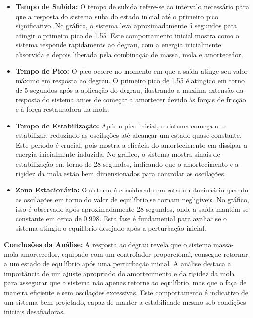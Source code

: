 \begin{itemize}
    \item \textbf{Tempo de Subida:} O tempo de subida refere-se ao intervalo necessário para que a resposta do sistema suba do estado inicial até o primeiro pico significativo. No gráfico, o sistema leva aproximadamente 5 segundos para atingir o primeiro pico de 1.55. Este comportamento inicial mostra como o sistema responde rapidamente ao degrau, com a energia inicialmente absorvida e depois liberada pela combinação de massa, mola e amortecedor.

    \item \textbf{Tempo de Pico:} O pico ocorre no momento em que a saída atinge seu valor máximo em resposta ao degrau. O primeiro pico de 1.55 é atingido em torno de 5 segundos após a aplicação do degrau, ilustrando a máxima extensão da resposta do sistema antes de começar a amortecer devido às forças de fricção e à força restauradora da mola.

    \item \textbf{Tempo de Estabilização:} Após o pico inicial, o sistema começa a se estabilizar, reduzindo as oscilações até alcançar um estado quase constante. Este período é crucial, pois mostra a eficácia do amortecimento em dissipar a energia inicialmente induzida. No gráfico, o sistema mostra sinais de estabilização em torno de 28 segundos, indicando que o amortecimento e a rigidez da mola estão bem dimensionados para controlar as oscilações.

    \item \textbf{Zona Estacionária:} O sistema é considerado em estado estacionário quando as oscilações em torno do valor de equilíbrio se tornam negligíveis. No gráfico, isso é observado após aproximadamente 28 segundos, onde a saída mantém-se constante em cerca de 0.998. Esta fase é fundamental para avaliar se o sistema atingiu o equilíbrio desejado após a perturbação inicial.
\end{itemize}


\textbf{Conclusões da Análise:} A resposta ao degrau revela que o sistema massa-mola-amortecedor, equipado com um controlador proporcional, consegue retornar a um estado de equilíbrio após uma perturbação inicial. A análise destaca a importância de um ajuste apropriado do amortecimento e da rigidez da mola para assegurar que o sistema não apenas retorne ao equilíbrio, mas que o faça de maneira eficiente e sem oscilações excessivas. Este comportamento é indicativo de um sistema bem projetado, capaz de manter a estabilidade mesmo sob condições iniciais desafiadoras.


